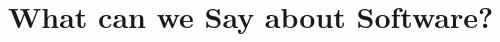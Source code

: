 \documentclass[a4paper,man,natbib]{apa6}
\begin{document}
   \section*{What can we Say about Software?}
\end{document}
